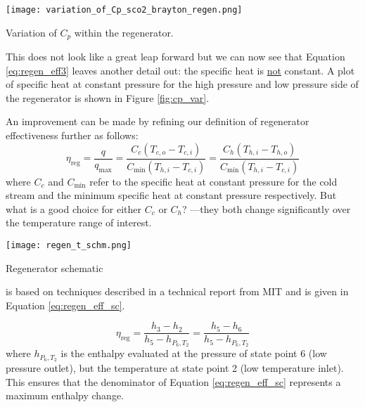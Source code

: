 \begin{marginfigure}
\texttt{[image: variation\_of\_Cp\_sco2\_brayton\_regen.png]}
\caption{Variation of $C_p$ within the regenerator.}
\label{fig:cp_var}
\end{marginfigure}

This does not look like a great leap forward but we can now see that Equation \ref{eq:regen_eff3} leaves another detail out: the specific heat is \underline{not} constant.  A plot of specific heat at constant pressure for the high pressure and low pressure side of the regenerator is shown in Figure \ref{fig:cp_var}. 

An improvement can be made by refining our definition of regenerator effectiveness further\cite{bergman2011introduction} as follows:
\begin{equation}
\eta_{\text{reg}}=\frac{q}{q_{\text{max}}}=\frac{C_c(T_{c,o}-T_{c,i})}{C_\text{min}(T_{h,i}-T_{c,i})} = \frac{C_h(T_{h,i}-T_{h,o})}{C_\text{min}(T_{h,i}-T_{c,i})}
\label{eq:regen_eff4}
\end{equation}
where $C_c$ and $C_{\text{min}}$ refer to the specific heat at constant pressure for the cold stream and the minimum specific heat at constant pressure respectively.  But what is a good choice for either $C_c$ or $C_h$? ---they both change significantly over the temperature range of interest.
\begin{marginfigure}
\texttt{[image: regen\_t\_schm.png]}
\caption{Regenerator schematic}
\label{fig:regen_t_schm}
\end{marginfigure}

 is based on techniques described in a technical report from MIT\cite{dostal2004supercritical} and is given in Equation \ref{eq:regen_eff_sc}.

\begin{equation}
\eta_{\text{reg}} = \frac{h_3 - h_2}{h_5 - h_{P_6,T_2}} = \frac{h_5 - h_6}{h_5 - h_{P_6,T_2}}
\label{eq:regen_eff_sc}
\end{equation}
where $h_{P_6,T_2}$ is the enthalpy evaluated at the pressure of state point 6 (low pressure outlet), but the temperature at state point 2 (low temperature inlet).  This ensures that the denominator of Equation \ref{eq:regen_eff_sc} represents a maximum enthalpy change. 
